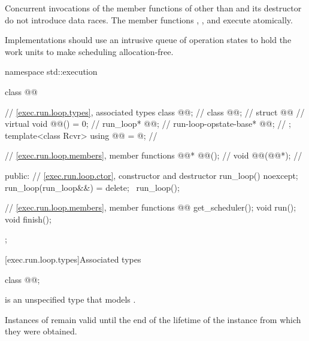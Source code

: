 \pnum
Concurrent invocations of the member functions of 
other than  and its destructor do not introduce data races.
The member functions
, , and 
execute atomically.

\pnum
\recommended
Implementations should use an intrusive queue of operation states
to hold the work units to make scheduling allocation-free.

\begin{codeblock}
namespace std::execution {
  class @@ {
    // \ref{exec.run.loop.types}, associated types
    class @@;                                   // \expos
    class @@;                                      // \expos
    struct @@ {                              // \expos
      virtual void @@() = 0;                               // \expos
      run_loop* @@;                                           // \expos
      run-loop-opstate-base* @@;                              // \expos
    };
    template<class Rcvr>
      using @@ = @\unspec@;                     // \expos

    // \ref{exec.run.loop.members}, member functions
    @@* @@();                         // \expos
    void @@(@@*);                     // \expos

  public:
    // \ref{exec.run.loop.ctor}, constructor and destructor
    run_loop() noexcept;
    run_loop(run_loop&&) = delete;
    ~run_loop();

    // \ref{exec.run.loop.members}, member functions
    @@ get_scheduler();
    void run();
    void finish();
  };
}
\end{codeblock}

[exec.run.loop.types]{Associated types}

\begin{itemdecl}
class @@;
\end{itemdecl}

\pnum
{} is an unspecified type
that models .

\pnum
Instances of  remain valid
until the end of the lifetime of the  instance
from which they were obtained.

